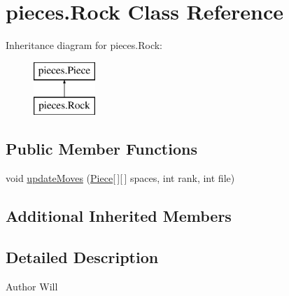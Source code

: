 \hypertarget{classpieces_1_1_rock}{\section{pieces.\-Rock Class Reference}
\label{classpieces_1_1_rock}
}
Inheritance diagram for pieces.\-Rock\-:\begin{figure}[H]
\begin{center}
\leavevmode
\includegraphics[height=2.000000cm]{classpieces_1_1_rock}
\end{center}
\end{figure}
\subsection*{Public Member Functions}
\begin{DoxyCompactItemize}
\item 
void \hyperlink{classpieces_1_1_rock_ae0225efa9bc90ae7a8bbe080f1ab55b6}{update\-Moves} (\hyperlink{classpieces_1_1_piece}{Piece}\mbox{[}$\,$\mbox{]}\mbox{[}$\,$\mbox{]} spaces, int rank, int file)
\end{DoxyCompactItemize}
\subsection*{Additional Inherited Members}


\subsection{Detailed Description}
\begin{DoxyAuthor}{Author}
Will 
\end{DoxyAuthor}


